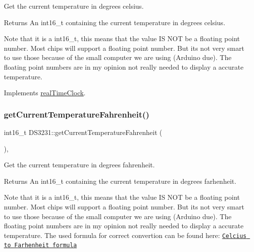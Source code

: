 Get the current temperature in degrees celsius. 

\begin{DoxyReturn}{Returns}
An int16\+\_\+t containing the current temperature in degrees celsius.
\end{DoxyReturn}
Note that it is a int16\+\_\+t, this means that the value IS N\+OT be a floating point number. Most chips will support a floating point number. But it\textquotesingle{}s not very smart to use those because of the small computer we are using (Arduino due). The floating point numbers are in my opinion not really needed to display a accurate temperature. 

Implements \mbox{\hyperlink{classreal_time_clock_ac662348fcf7b5fb51fdcf79f83958a33}{real\+Time\+Clock}}.

\mbox{\label{class_d_s3231_aa31acb133cc63aa7a2a25eda6244c9df}} 
\subsubsection{\texorpdfstring{get\+Current\+Temperature\+Fahrenheit()}{getCurrentTemperatureFahrenheit()}}
{\footnotesize\ttfamily int16\+\_\+t D\+S3231\+::get\+Current\+Temperature\+Fahrenheit (\begin{DoxyParamCaption}{ }\end{DoxyParamCaption})\hspace{0.3cm}{\ttfamily [override]}, {\ttfamily [virtual]}}



Get the current temperature in degrees fahrenheit. 

\begin{DoxyReturn}{Returns}
An int16\+\_\+t containing the current temperature in degrees farhenheit.
\end{DoxyReturn}
Note that it is a int16\+\_\+t, this means that the value IS N\+OT be a floating point number. Most chips will support a floating point number. But it\textquotesingle{}s not very smart to use those because of the small computer we are using (Arduino due). The floating point numbers are in my opinion not really needed to display a accurate temperature. The used formula for correct convertion can be found here\+: \href{https://www.rapidtables.com/convert/temperature/how-celsius-to-fahrenheit.html}{\tt Celcius to Farhenheit formula} 

